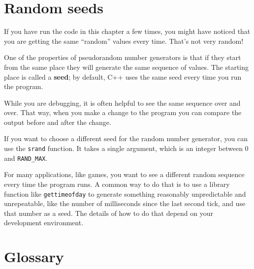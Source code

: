 \section{Random seeds}

If you have run the code in this chapter a few times, you might
have noticed that you are getting the same ``random'' values
every time.  That's not very random!

One of the properties of pseudorandom number generators is that
if they start from the same place they will generate
the same sequence of values.  The starting place is called
a {\bf seed}; by default, C++ uses
the same seed every time you run the program.

While you are debugging, it is often helpful to
see the same sequence over and over.  That way, when you make
a change to the program you can compare the output before and
after the change.

If you want to choose a different seed for the random number
generator, you can use the {\tt srand} function.  It takes
a single argument, which is an integer between 0 and {\tt RAND\_MAX}.

For many applications, like games, you want to see a different
random sequence every time the program runs.  A common way to
do that is to use a library function like {\tt gettimeofday}
to generate something reasonably unpredictable
and unrepeatable, like the number of milliseconds since the
last second tick, and use that number as a seed.  The details
of how to do that depend on your development environment.

\section{Glossary}

